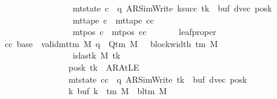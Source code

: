 \begin{isabellebody}
\ \ \ \ \ \ \ \ \ \ \ \ \ \ \ \ \ \ \ \ \ \ \ {\isasymand}\ mt{\isacharunderscore}{\kern0pt}state\ c{\isacharprime}{\kern0pt}{\isacharprime}{\kern0pt}\ {\isacharequal}{\kern0pt}\ {\isacharparenleft}{\kern0pt}q{\isacharcomma}{\kern0pt}\ AR{\isacharunderscore}{\kern0pt}SimWrite{\isacharcomma}{\kern0pt}\ k{\isacharunderscore}{\kern0pt}succ\ tk{\isacharcomma}{\kern0pt}\ {}{\isacharcomma}{\kern0pt}\ buf{\isacharcomma}{\kern0pt}\ dvec{\isacharcomma}{\kern0pt}\ posk{\isacharparenright}{\kern0pt}\isanewline
\ \ \ \ \ \ \ \ \ \ \ \ \ \ \ \ \ \ \ \ \ \ \ {\isasymand}\ mt{\isacharunderscore}{\kern0pt}tape\ c{\isacharprime}{\kern0pt}{\isacharprime}{\kern0pt}\ {\isacharequal}{\kern0pt}\ mt{\isacharunderscore}{\kern0pt}tape\ cc\isanewline
\ \ \ \ \ \ \ \ \ \ \ \ \ \ \ \ \ \ \ \ \ \ \ {\isasymand}\ mt{\isacharunderscore}{\kern0pt}pos\ c{\isacharprime}{\kern0pt}{\isacharprime}{\kern0pt}\ {\isacharequal}{\kern0pt}\ mt{\isacharunderscore}{\kern0pt}pos\ cc{\isachardoublequoteclose}\isanewline
\ \ \ \ \ \ \ leaf{\isacharunderscore}{\kern0pt}proper{\isacharcolon}{\kern0pt}\isanewline
\ \ \ \ \ \ \ \ {\isachardoublequoteopen}{\isasymAnd}cc\ base{\isacharprime}{\kern0pt}{\isachardot}{\kern0pt}\ {\isasymlbrakk}\ valid{\isacharunderscore}{\kern0pt}mttm\ M{\isacharsemicolon}{\kern0pt}\ q\ {\isasymin}\ Q{\isacharunderscore}{\kern0pt}tm\ M{\isacharsemicolon}{\kern0pt}\ {}\ {\isasymle}\ block{\isacharunderscore}{\kern0pt}width\ {\isacharparenleft}{\kern0pt}{\isasymGamma}{\isacharunderscore}{\kern0pt}tm\ M{\isacharparenright}{\kern0pt}{\isacharsemicolon}{\kern0pt}\isanewline
\ \ \ \ \ \ \ \ \ \ \ \ \ \ \ \ \ \ \ \ \ \ \ {\isasymnot}\ is{\isacharunderscore}{\kern0pt}last{\isacharunderscore}{\kern0pt}k\ M\ tk{\isacharsemicolon}{\kern0pt}\isanewline
\ \ \ \ \ \ \ \ \ \ \ \ \ \ \ \ \ \ \ \ \ \ \ posk\ tk\ {\isasymnoteq}\ AR{\isacharunderscore}{\kern0pt}AtLE{\isacharsemicolon}{\kern0pt}\isanewline
\ \ \ \ \ \ \ \ \ \ \ \ \ \ \ \ \ \ \ \ \ \ \ mt{\isacharunderscore}{\kern0pt}state\ cc\ {\isacharequal}{\kern0pt}\ {\isacharparenleft}{\kern0pt}q{\isacharcomma}{\kern0pt}\ AR{\isacharunderscore}{\kern0pt}SimWrite{\isacharcomma}{\kern0pt}\ tk{\isacharcomma}{\kern0pt}\ {}{\isacharcomma}{\kern0pt}\ buf{\isacharcomma}{\kern0pt}\ dvec{\isacharcomma}{\kern0pt}\ posk{\isacharparenright}{\kern0pt}{\isacharsemicolon}{\kern0pt}\isanewline
\ \ \ \ \ \ \ \ \ \ \ \ \ \ \ \ \ \ \ \ \ \ \ {\isasymforall}k{\isachardot}{\kern0pt}\ buf\ k\ {\isasymin}\ {\isasymGamma}{\isacharunderscore}{\kern0pt}tm\ M\ {\isasymunion}\ {\isacharbraceleft}{\kern0pt}bl{\isacharunderscore}{\kern0pt}tm\ M{\isacharbraceright}{\kern0pt}{\isacharsemicolon}{\kern0pt}\isanewline

\end{isabellebody}
